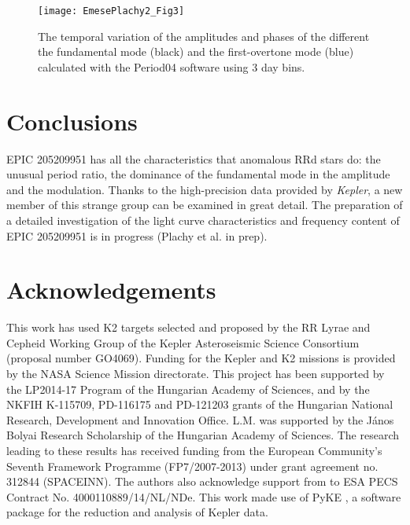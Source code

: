 \documentclass[epj,twocolumn]{webofc}
\begin{document}
\begin{figure}
\centering
\texttt{[image: EmesePlachy2\_Fig3]}
\caption{The temporal variation of the amplitudes and phases of the different the fundamental mode (black) and the first-overtone mode (blue) calculated with the Period04 software using 3 day bins.}
\label{fig-3}       %
\end{figure}


\section{Conclusions}

EPIC 205209951 has all the characteristics that anomalous RRd stars do:
the unusual period ratio, the dominance of the fundamental mode in the amplitude and the modulation. Thanks to the high-precision data provided by \textit{Kepler}, a new member of this strange group can be examined in great detail. The preparation of a detailed investigation of the light curve characteristics and frequency content of  EPIC 205209951 is in progress (Plachy et al. in prep).



\label{sec-con}
\section*{Acknowledgements}
\label{sec-ack}

This work has used K2 targets selected and proposed by the RR Lyrae and Cepheid Working Group of the Kepler Asteroseismic Science Consortium (proposal number GO4069). Funding for the Kepler and K2 missions is provided by the NASA Science Mission directorate. This project has been supported by the LP2014-17 Program of the Hungarian Academy of Sciences, and by the NKFIH K-115709, PD-116175 and PD-121203 grants of the Hungarian National Research, Development and Innovation Office. L.M. was supported by the János Bolyai Research Scholarship of the Hungarian Academy of Sciences. The research leading to these results has received funding from the European Community's Seventh Framework Programme (FP7/2007-2013) under grant agreement no. 312844 (SPACEINN). The authors also acknowledge support from to ESA PECS Contract No. 4000110889/14/NL/NDe. This work made use of PyKE \cite{still}, a software package for the reduction and analysis of Kepler data. 
\end{document}
